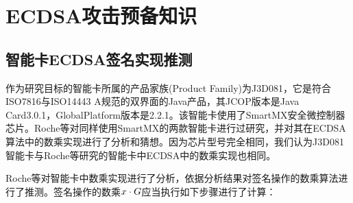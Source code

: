 {%

	\section{ECDSA攻击预备知识}\label{sec:vulnerable}
	\subsection{智能卡ECDSA签名实现推测}
	
	作为研究目标的智能卡所属的产品家族(Product Family)为J3D081，它是符合ISO7816\citep{ISO/IEC7816}与ISO14443 A\citep{ISO/IEC14443}规范的双界面的Java产品，其JCOP版本是Java Card3.0.1，GlobalPlatform版本是2.2.1。该智能卡使用了SmartMX\citep{p5x}安全微控制器芯片。Roche等\citep{Roche21}对同样使用SmartMX的两款智能卡进行过研究，并对其在ECDSA算法中的数乘实现进行了分析和猜想。因为芯片型号完全相同，我们认为J3D081智能卡与Roche等\citep{Roche21}研究的智能卡中ECDSA中的数乘实现也相同。
	
	Roche等\citep{Roche21}对智能卡中数乘实现进行了分析，依据分析结果对签名操作的数乘算法进行了推测。签名操作的数乘$x\cdot G$应当执行如下步骤进行了计算：
	
}
